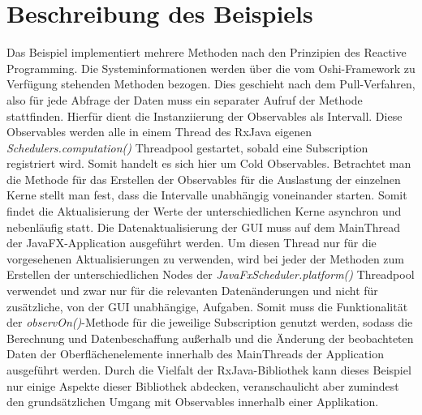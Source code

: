\section{Beschreibung des Beispiels}
Das Beispiel implementiert mehrere Methoden nach den Prinzipien des Reactive Programming. Die Systeminformationen werden über die vom Oshi-Framework zu Verfügung stehenden Methoden bezogen. Dies geschieht nach dem Pull-Verfahren, also für jede Abfrage der Daten muss ein separater Aufruf der Methode stattfinden. Hierfür dient die Instanziierung der Observables als Intervall. Diese Observables werden alle in einem Thread des RxJava eigenen \textit{Schedulers.computation()} Threadpool gestartet, sobald eine Subscription registriert wird. Somit handelt es sich hier um Cold Observables. Betrachtet man die Methode für das Erstellen der Observables für die Auslastung der einzelnen Kerne stellt man fest, dass die Intervalle unabhängig voneinander starten. Somit findet die Aktualisierung der Werte der unterschiedlichen Kerne asynchron und nebenläufig statt. Die Datenaktualisierung der GUI muss auf dem MainThread der JavaFX-Application ausgeführt werden. Um diesen Thread nur für die vorgesehenen Aktualisierungen zu verwenden, wird bei jeder der Methoden zum Erstellen der unterschiedlichen Nodes der \textit{JavaFxScheduler.platform()} Threadpool verwendet und zwar nur für die relevanten Datenänderungen und nicht für zusätzliche, von der GUI unabhängige, Aufgaben. Somit muss die Funktionalität der \textit{observOn()}-Methode für die jeweilige Subscription genutzt werden, sodass die Berechnung und Datenbeschaffung außerhalb und die Änderung der beobachteten Daten der Oberflächenelemente innerhalb des MainThreads der Application ausgeführt werden. Durch die Vielfalt der RxJava-Bibliothek kann dieses Beispiel nur einige Aspekte dieser Bibliothek abdecken, veranschaulicht aber zumindest den grundsätzlichen Umgang mit Observables innerhalb einer Applikation.
